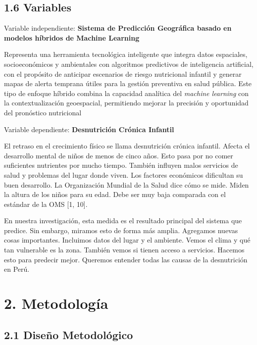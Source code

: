 \documentclass[
]{report}
\begin{document}
\hypertarget{variables}{%
\subsection{1.6 Variables}\label{variables}}

Variable independiente: \textbf{Sistema de Predicción Geográfica basado
en modelos híbridos de Machine Learning}

Representa una herramienta tecnológica inteligente que integra datos
espaciales, socioeconómicos y ambientales con algoritmos predictivos de
inteligencia artificial, con el propósito de anticipar escenarios de
riesgo nutricional infantil y generar mapas de alerta temprana útiles
para la gestión preventiva en salud pública. Este tipo de enfoque
híbrido combina la capacidad analítica del \emph{machine learning} con
la contextualización geoespacial, permitiendo mejorar la precisión y
oportunidad del pronóstico nutricional

Variable dependiente: \textbf{Desnutrición Crónica Infantil}

El retraso en el crecimiento físico se llama desnutrición crónica infantil. Afecta el desarrollo mental de niños de menos de cinco años. Esto pasa por no comer suficientes nutrientes por mucho tiempo. También influyen malos servicios de salud y problemas del lugar donde viven. Los factores económicos dificultan su buen desarrollo. La Organización Mundial de la Salud dice cómo se mide. Miden la altura de los niños para su edad. Debe ser muy baja comparada con el estándar de la OMS {[}1, 10{]}.

En nuestra investigación, esta medida es el resultado principal del sistema que predice. Sin embargo, miramos esto de forma más amplia. Agregamos nuevas cosas importantes. Incluimos datos del lugar y el ambiente. Vemos el clima y qué tan vulnerable es la zona. También vemos si tienen acceso a servicios. Hacemos esto para predecir mejor. Queremos entender todas las causas de la desnutrición en Perú.

\hypertarget{metodologuxeda}{%
\section{2. Metodología}\label{metodologuxeda}}

\hypertarget{diseuxf1o-metodoluxf3gico}{%
\subsection{2.1 Diseño Metodológico}\label{diseuxf1o-metodoluxf3gico}}
\end{document}
